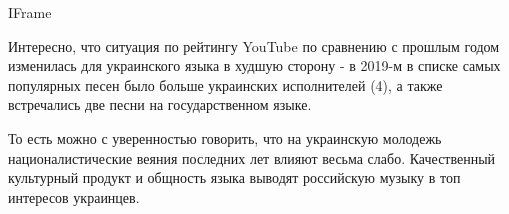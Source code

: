IFrame

Интересно, что ситуация по рейтингу YouTube по сравнению с прошлым годом
изменилась для украинского языка в худшую сторону - в 2019-м в списке самых
популярных песен было больше украинских исполнителей (4), а также встречались
две песни на государственном языке. 

То есть можно с уверенностью говорить, что на украинскую молодежь
националистические веяния последних лет влияют весьма слабо. Качественный
культурный продукт и общность языка выводят российскую музыку в топ интересов
украинцев. 


